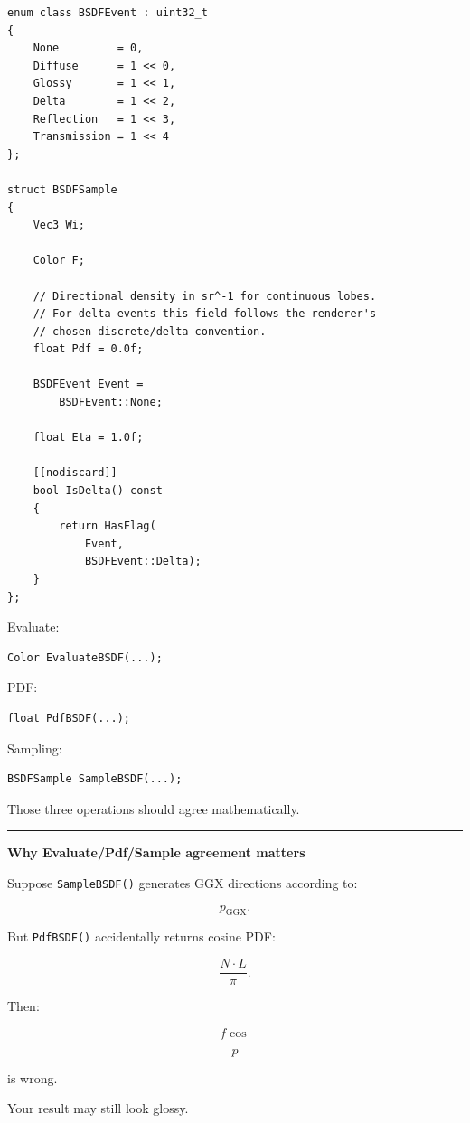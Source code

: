 \begin{verbatim}
enum class BSDFEvent : uint32_t
{
    None         = 0,
    Diffuse      = 1 << 0,
    Glossy       = 1 << 1,
    Delta        = 1 << 2,
    Reflection   = 1 << 3,
    Transmission = 1 << 4
};

struct BSDFSample
{
    Vec3 Wi;

    Color F;

    // Directional density in sr^-1 for continuous lobes.
    // For delta events this field follows the renderer's
    // chosen discrete/delta convention.
    float Pdf = 0.0f;

    BSDFEvent Event =
        BSDFEvent::None;

    float Eta = 1.0f;

    [[nodiscard]]
    bool IsDelta() const
    {
        return HasFlag(
            Event,
            BSDFEvent::Delta);
    }
};
\end{verbatim}

Evaluate:

\begin{verbatim}
Color EvaluateBSDF(...);
\end{verbatim}

PDF:

\begin{verbatim}
float PdfBSDF(...);
\end{verbatim}

Sampling:

\begin{verbatim}
BSDFSample SampleBSDF(...);
\end{verbatim}

Those three operations should agree mathematically.

\begin{center}\rule{0.5\linewidth}{0.5pt}\end{center}

\textbf{Why Evaluate/Pdf/Sample agreement matters}

Suppose \texttt{SampleBSDF()} generates GGX directions according to:

\[
p_{\text{GGX}}.
\]

But \texttt{PdfBSDF()} accidentally returns cosine PDF:

\[
\frac{N\cdot L}{\pi}.
\]

Then:

\[
\frac{f\cos}{p}
\]

is wrong.

Your result may still look glossy.


